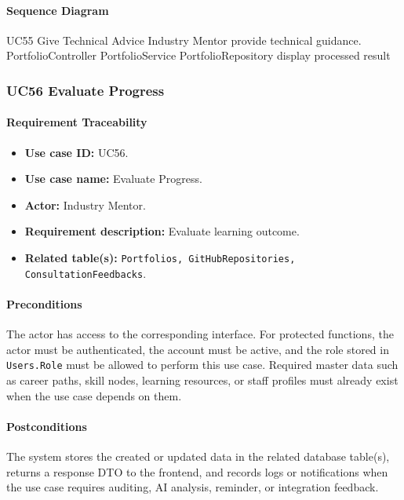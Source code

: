 \paragraph{Sequence Diagram}

\SequenceDiagram
{UC55 Give Technical Advice}
{Industry Mentor}
{provide technical guidance.}
{PortfolioController}
{PortfolioService}
{PortfolioRepository}
{display processed result}

\subsubsection{UC56 Evaluate Progress}

\paragraph{Requirement Traceability}

\begin{itemize}
    \item \textbf{Use case ID:} UC56.
    \item \textbf{Use case name:} Evaluate Progress.
    \item \textbf{Actor:} Industry Mentor.
    \item \textbf{Requirement description:} Evaluate learning outcome.
    \item \textbf{Related table(s):} \texttt{Portfolios, GitHubRepositories, ConsultationFeedbacks}.
\end{itemize}

\paragraph{Preconditions}

The actor has access to the corresponding interface. For protected functions, the actor must be authenticated, the account must be active, and the role stored in \texttt{Users.Role} must be allowed to perform this use case. Required master data such as career paths, skill nodes, learning resources, or staff profiles must already exist when the use case depends on them.

\paragraph{Postconditions}

The system stores the created or updated data in the related database table(s), returns a response DTO to the frontend, and records logs or notifications when the use case requires auditing, AI analysis, reminder, or integration feedback.

